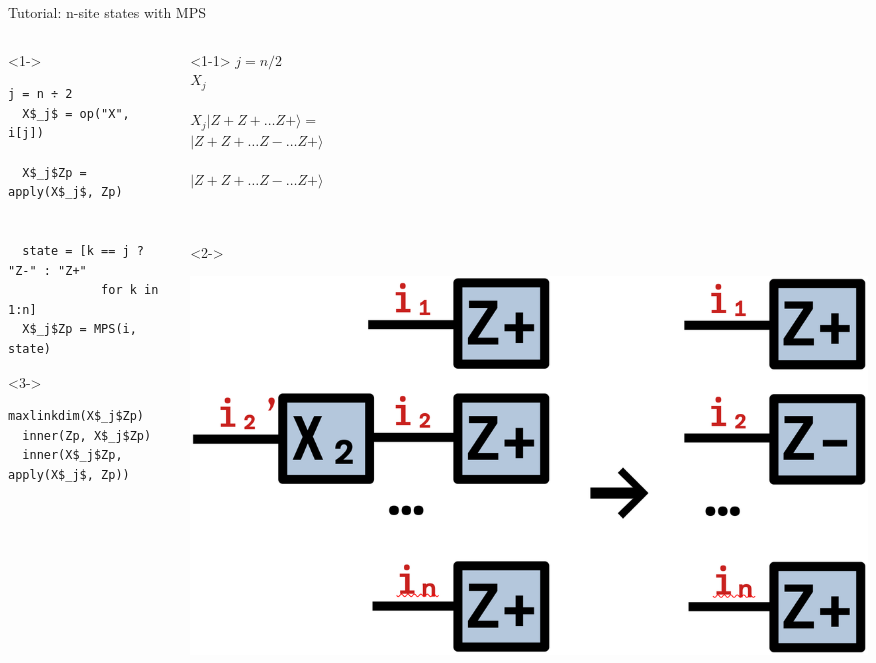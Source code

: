 \begin{frame}[fragile]{Tutorial: n-site states with MPS}

\begin{columns}

\begin{column}{6cm}

\begin{onlyenv}<1->
\begin{lstlisting}[language=JuliaLocal, style=julia, mathescape, basicstyle=\small]
  j = n ÷ 2
  X$_j$ = op("X", i[j])

  X$_j$Zp = apply(X$_j$, Zp)


  state = [k == j ? "Z-" : "Z+"
             for k in 1:n]
  X$_j$Zp = MPS(i, state)
\end{lstlisting}
\end{onlyenv}

\begin{onlyenv}<3->
\begin{lstlisting}[language=JuliaLocal, style=julia, mathescape, basicstyle=\small]
  maxlinkdim(X$_j$Zp)
  inner(Zp, X$_j$Zp)
  inner(X$_j$Zp, apply(X$_j$, Zp))
\end{lstlisting}
\end{onlyenv}

\end{column}

\begin{column}{4cm}

\begin{onlyenv}<1-1>
$j = n/2$ \\
$X_j$ \\
~\\
$X_j|Z+Z+\dots Z+\rangle =$ \\
$|Z+Z+\dots Z-\dots Z+\rangle$ \\
~\\
$|Z+Z+\dots Z-\dots Z+\rangle$ \\
~\\
~\\
\end{onlyenv}

\begin{onlyenv}<2->
\vspace*{0.0cm}
\begin{center}
\includegraphics[width=1.0\textwidth]{
  slides/assets/XjZpn.png
}
\end{center}
\vspace*{0.0cm}
\end{onlyenv}


\end{column}
\end{columns}
\end{frame}
